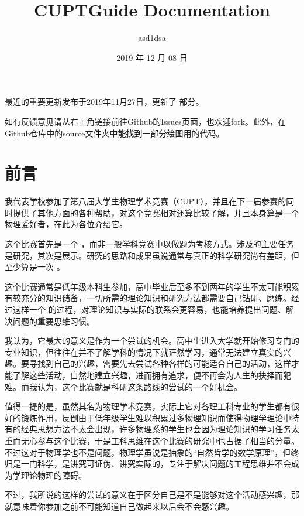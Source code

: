 \documentclass[a4paper,10pt,english]{sphinxmanual}
\title{CUPTGuide Documentation}
\date{2019 年 12 月 08 日}
\author{asd1dsa}
\begin{document}
\maketitle
\sphinxtableofcontents
{}\label{\detokenize{index::doc}}


最近的重要更新发布于2019年11月27日，更新了  部分。

如有反馈意见请从右上角链接前往Github的Issues页面，也欢迎fork。此外，在Github仓库中的source文件夹中能找到一部分绘图用的代码。


\chapter{前言}
\label{\detokenize{1. Preface:by-asd1dsa}}\label{\detokenize{1. Preface:id1}}\label{\detokenize{1. Preface::doc}}
我代表学校参加了第八届大学生物理学术竞赛（CUPT），并且在下一届参赛的同时提供了其他方面的各种帮助，对这个竞赛相对还算比较了解，并且本身算是一个物理爱好者，在此为各位介绍它。

这个比赛首先是一个  ，而非一般学科竞赛中以做题为考核方式。涉及的主要任务是研究，其次是展示。研究的思路和成果虽说通常与真正的科学研究尚有差距，但至少算是一次  。

这个比赛通常是低年级本科生参加，高中毕业后至多不到两年的学生不太可能积累有较充分的知识储备，一切所需的理论知识和研究方法都需要自己钻研、磨练。经过这样一个  的过程，对理论知识与实际的联系会更容易，也能培养提出问题、解决问题的重要思维习惯。

我认为，它最大的意义是作为一个尝试的机会。高中生进入大学就开始修习专门的专业知识，但往往在并不了解学科的情况下就茫然学习，通常无法建立真实的兴趣。要寻找到自己的兴趣，需要先去尝试各种各样的可能适合自己的活动，这样才能了解这些活动，自然地建立兴趣，进而拥有追求，便不再会为人生的抉择而犯难。而我认为，这个比赛就是科研这条路线的尝试的一个好机会。

值得一提的是，虽然其名为物理学术竞赛，实际上它对各理工科专业的学生都有很好的锻炼作用，反倒由于低年级学生难以积累过多物理知识而使得物理学理论中特有的经典思想方法不太会出现，许多物理系的学生也会因为理论知识的学习任务太重而无心参与这个比赛，于是工科思维在这个比赛的研究中也占据了相当的分量。不过这对于物理学也不是问题，物理学虽说是抽象的“自然哲学的数学原理”，但终归是一门科学，是讲究可证伪、讲究实际的，专注于解决问题的工程思维并不会成为学理论物理的障碍。

不过，我所说的这样的尝试的意义在于区分自己是不是能够对这个活动感兴趣，那就意味着你参加之前不可能知道自己做起来以后会不会感兴趣。
\end{document}

